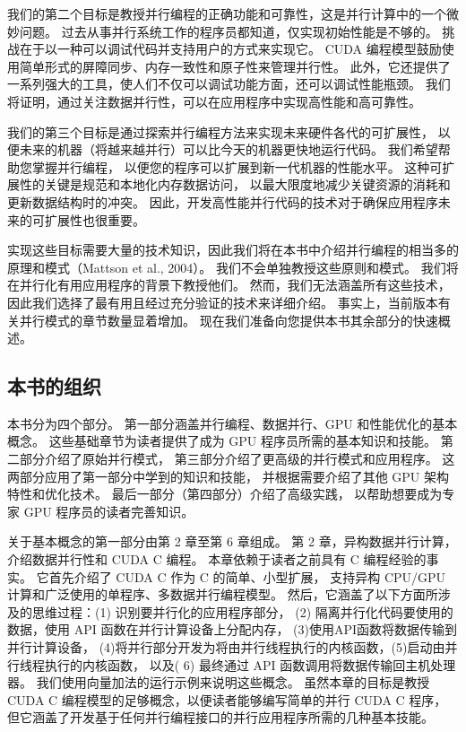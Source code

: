 我们的第二个目标是教授并行编程的正确功能和可靠性，这是并行计算中的一个微妙问题。 
过去从事并行系统工作的程序员都知道，仅实现初始性能是不够的。 挑战在于以一种可以调试代码并支持用户的方式来实现它。 
CUDA 编程模型鼓励使用简单形式的屏障同步、内存一致性和原子性来管理并行性。 
此外，它还提供了一系列强大的工具，使人们不仅可以调试功能方面，还可以调试性能瓶颈。 
我们将证明，通过关注数据并行性，可以在应用程序中实现高性能和高可靠性。

我们的第三个目标是通过探索并行编程方法来实现未来硬件各代的可扩展性，
以便未来的机器（将越来越并行）可以比今天的机器更快地运行代码。 我们希望帮助您掌握并行编程，
以便您的程序可以扩展到新一代机器的性能水平。 这种可扩展性的关键是规范和本地化内存数据访问，
以最大限度地减少关键资源的消耗和更新数据结构时的冲突。 
因此，开发高性能并行代码的技术对于确保应用程序未来的可扩展性也很重要。

实现这些目标需要大量的技术知识，因此我们将在本书中介绍并行编程的相当多的原理和模式（Mattson et al., 2004）。 
我们不会单独教授这些原则和模式。 我们将在并行化有用应用程序的背景下教授他们。 
然而，我们无法涵盖所有这些技术，因此我们选择了最有用且经过充分验证的技术来详细介绍。 
事实上，当前版本有关并行模式的章节数量显着增加。 现在我们准备向您提供本书其余部分的快速概述。

\subsection{本书的组织}
本书分为四个部分。 第一部分涵盖并行编程、数据并行、GPU 和性能优化的基本概念。 
这些基础章节为读者提供了成为 GPU 程序员所需的基本知识和技能。 第二部分介绍了原始并行模式，
第三部分介绍了更高级的并行模式和应用程序。 这两部分应用了第一部分中学到的知识和技能，
并根据需要介绍了其他 GPU 架构特性和优化技术。 最后一部分（第四部分）介绍了高级实践，
以帮助想要成为专家 GPU 程序员的读者完善知识。

关于基本概念的第一部分由第 2 章至第 6 章组成。 第 2 章，异构数据并行计算，介绍数据并行性和 CUDA C 编程。 
本章依赖于读者之前具有 C 编程经验的事实。 它首先介绍了 CUDA C 作为 C 的简单、小型扩展，
支持异构 CPU/GPU 计算和广泛使用的单程序、多数据并行编程模型。 
然后，它涵盖了以下方面所涉及的思维过程：(1) 识别要并行化的应用程序部分，
(2) 隔离并行化代码要使用的数据，使用 API 函数在并行计算设备上分配内存， (3)使用API函数将数据传输到并行计算设备，
(4)将并行部分开发为将由并行线程执行的内核函数，(5)启动由并行线程执行的内核函数，
以及( 6) 最终通过 API 函数调用将数据传输回主机处理器。 我们使用向量加法的运行示例来说明这些概念。 
虽然本章的目标是教授 CUDA C 编程模型的足够概念，以便读者能够编写简单的并行 CUDA C 程序，
但它涵盖了开发基于任何并行编程接口的并行应用程序所需的几种基本技能。

